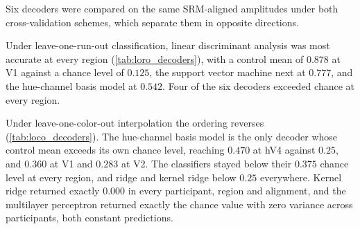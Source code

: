 

Six decoders were compared on the same SRM-aligned amplitudes under both cross-validation schemes, which separate them in opposite directions.

Under leave-one-run-out classification, linear discriminant analysis was most accurate at every region (\cref{tab:loro_decoders}), with a control mean of $0.878$ at V1 against a chance level of $0.125$, the support vector machine next at $0.777$, and the hue-channel basis model at $0.542$. Four of the six decoders exceeded chance at every region.

Under leave-one-color-out interpolation the ordering reverses (\cref{tab:loco_decoders}). The hue-channel basis model is the only decoder whose control mean exceeds its own chance level, reaching $0.470$ at hV4 against $0.25$, and $0.360$ at V1 and $0.283$ at V2. The classifiers stayed below their $0.375$ chance level at every region, and ridge and kernel ridge below $0.25$ everywhere. Kernel ridge returned exactly $0.000$ in every participant, region and alignment, and the multilayer perceptron returned exactly the chance value with zero variance across participants, both constant predictions.

